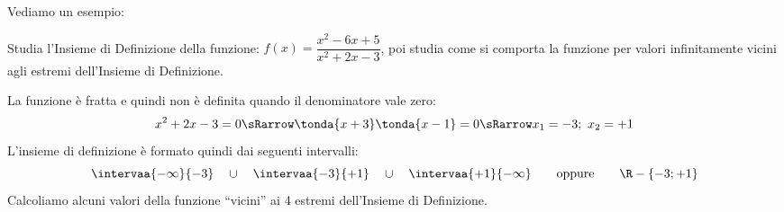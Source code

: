 Vediamo un esempio:

\begin{esempio}
 Studia l'Insieme di Definizione della funzione: 
 \(f(x)=\dfrac{x^2-6x+5}{x^2+2x-3}\),\quad
poi studia come si comporta la funzione per valori infinitamente vicini 
agli estremi dell'Insieme di Definizione.

La funzione è fratta e quindi non è definita quando il denominatore vale 
zero:
\[x^2+2x-3=0 \sRarrow \tonda{x+3}\tonda{x-1}=0 \sRarrow x_1=-3;~x_2=+1\]
L'insieme di definizione è formato quindi dai seguenti intervalli:
\[\intervaa{-\infty}{-3} \quad \cup \quad 
\intervaa{-3}{+1}\quad \cup \quad 
\intervaa{+1}{-\infty} \qquad \text{oppure} \qquad
\R - \{-3; +1\}\]
Calcoliamo alcuni valori della funzione ``vicini'' ai 4 estremi 
dell'Insieme di Definizione.


\end{esempio}

